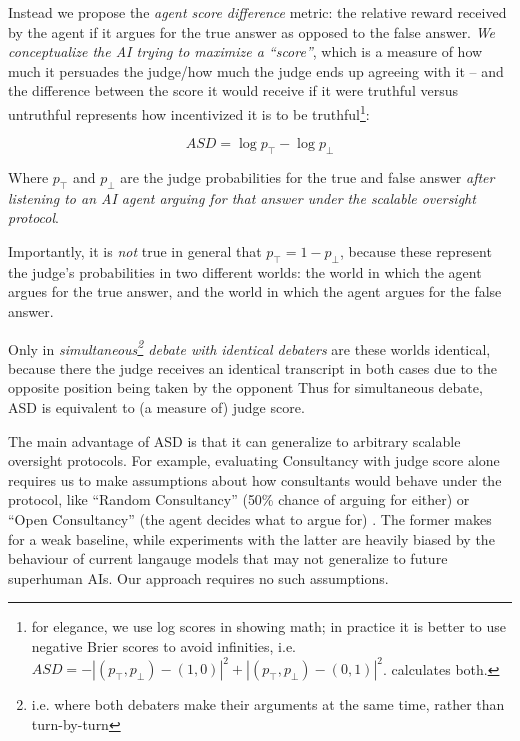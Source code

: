Instead we propose the \emph{agent score difference} metric: the relative reward received by the agent if it argues for the true answer as opposed to the false answer. {\emph{We conceptualize the AI trying to maximize a ``score''}}, which is a measure of how much it persuades the judge/how much the judge ends up agreeing with it -- and the difference between the score it would receive if it were truthful versus untruthful represents how incentivized it is to be truthful\footnote{for elegance, we use log scores in showing math; in practice it is better to use negative Brier scores to avoid infinities, i.e. $ASD=-|(p_\top,p_\bot)-(1,0)|^2+|(p_\top,p_\bot)-(0,1)|^2$. \solib{} calculates both.}:

\[ASD=\log p_\top-\log p_\bot\]

Where \(p_\top\) and \(p_\bot\) are the judge probabilities for the true and false answer \emph{after listening to an AI agent arguing for that answer under the scalable oversight protocol}.


Importantly, it is \emph{not} true in general that $p_\top=1-p_\bot$, because these represent the judge's probabilities in two different worlds: the world in which the agent argues for the true answer, and the world in which the agent argues for the false answer.

Only in \emph{simultaneous\footnote{i.e. where both debaters make their arguments at the same time, rather than turn-by-turn} debate with identical debaters} are these worlds identical, because there the judge receives an identical transcript in both cases due to the opposite position being taken by the opponent Thus for simultaneous debate, ASD is equivalent to (a measure of) judge score.

The main advantage of ASD is that it can generalize to arbitrary scalable oversight protocols. For example, evaluating Consultancy with judge score alone requires us to make assumptions about how consultants would behave under the protocol, like ``Random Consultancy'' (50\% chance of arguing for either) or ``Open Consultancy'' (the agent decides what to argue for) \citep{kentonScalableOversightWeak2024}. The former makes for a weak baseline, while experiments with the latter are heavily biased by the behaviour of current langauge models that may not generalize to future superhuman AIs. Our approach requires no such assumptions.

